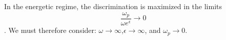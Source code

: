In the energetic regime, the discrimination is maximized in the limits
\[\frac{\omega_p}{\omega e^{\epsilon}}\to0\].
We must therefore consider: $\omega\to\infty$,$\epsilon\to\infty$, and $\omega_p\to0.$

%
%
%
%
%
%
